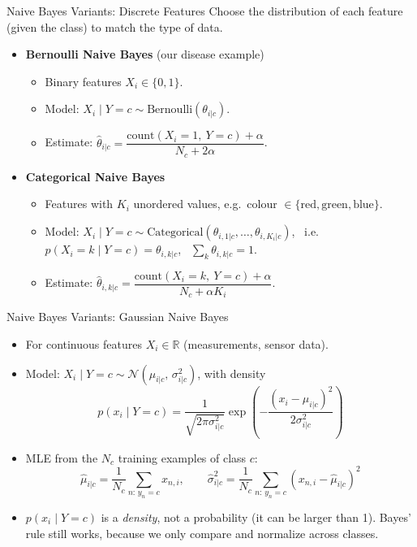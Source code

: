 \documentclass[aspectratio=169]{beamer}
\begin{document}
\begin{frame}{Naive Bayes Variants: Discrete Features}
Choose the distribution of each feature (given the class) to match the type of data.
\begin{itemize}
  \item \textbf{Bernoulli Naive Bayes} (our disease example)
  \begin{itemize}
    \item Binary features $X_i\in\{0,1\}$.
    \item Model: $X_i\mid Y=c \sim \mathrm{Bernoulli}(\theta_{i|c})$.
    \item Estimate: $\hat\theta_{i|c}=\dfrac{\text{count}(X_i=1,\ Y=c)+\alpha}{N_c+2\alpha}$.
  \end{itemize}
  \item \textbf{Categorical Naive Bayes}
  \begin{itemize}
    \item Features with $K_i$ unordered values, e.g.\ colour $\in\{\text{red},\text{green},\text{blue}\}$.
    \item Model: $X_i\mid Y=c \sim \mathrm{Categorical}(\theta_{i,1|c},\dots,\theta_{i,K_i|c})$, \
          i.e.\ $p(X_i=k\mid Y=c)=\theta_{i,k|c}$, \ $\sum_{k}\theta_{i,k|c}=1$.
    \item Estimate: $\hat\theta_{i,k|c}=\dfrac{\text{count}(X_i=k,\ Y=c)+\alpha}{N_c+\alpha K_i}$.
  \end{itemize}
\end{itemize}
\end{frame}

\begin{frame}{Naive Bayes Variants: Gaussian Naive Bayes}
\begin{itemize}
  \item For continuous features $X_i\in\mathbb{R}$ (measurements, sensor data).
  \item Model: $X_i\mid Y=c \sim \mathcal{N}(\mu_{i|c},\,\sigma^2_{i|c})$, with density
  \[
    p(x_i\mid Y=c) = \frac{1}{\sqrt{2\pi\sigma^2_{i|c}}} \exp\!\left(-\frac{(x_i-\mu_{i|c})^2}{2\sigma^2_{i|c}}\right)
  \]
  \item MLE from the $N_c$ training examples of class $c$:
  \[
    \hat{\mu}_{i|c} = \frac{1}{N_c}\sum_{n:\,y_n=c} x_{n,i}, \qquad
    \hat{\sigma}^2_{i|c} = \frac{1}{N_c}\sum_{n:\,y_n=c} (x_{n,i} - \hat{\mu}_{i|c})^2
  \]
  \item $p(x_i\mid Y=c)$ is a \emph{density}, not a probability (it can be larger than 1).
        Bayes' rule still works, because we only compare and normalize across classes.
\end{itemize}
\end{frame}
\end{document}
